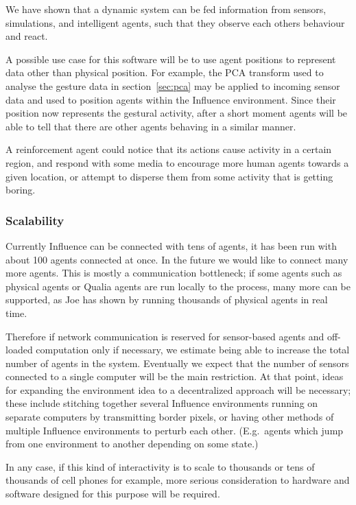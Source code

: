 \documentclass{article}
\begin{document}
We have shown that a dynamic system can be fed information from
sensors, simulations, and intelligent agents, such that they observe
each others behaviour and react.

A possible use case for this software will be to use agent positions
to represent data other than physical position.
For example, the PCA transform used to analyse the gesture data in
section~\ref{sec:pca} may be applied to incoming sensor data and used
to position agents within the Influence environment.
Since their position now represents the gestural activity, after a
short moment agents will be able to tell that there are other agents
behaving in a similar manner.

A reinforcement agent could notice that its actions cause activity in
a certain region, and respond with some media to encourage more human
agents towards a given location, or attempt to disperse them from some
activity that is getting boring.

\subsubsection{Scalability}

Currently Influence can be connected with tens of agents, it has been
run with about 100 agents connected at once.
In the future we would like to connect many more agents.
This is mostly a communication bottleneck; if some agents such as
physical agents or Qualia agents are run locally to the process, many
more can be supported, as Joe has shown by running thousands of
physical agents in real time.

Therefore if network communication is reserved for sensor-based agents
and off-loaded computation only if necessary, we estimate being able
to increase the total number of agents in the system.
Eventually we expect that the number of sensors connected to a single
computer will be the main restriction.
At that point, ideas for expanding the environment idea to a
decentralized approach will be necessary; these include stitching
together several Influence environments running on separate computers
by transmitting border pixels, or having other methods of multiple
Influence environments to perturb each other.
(E.g.\ agents which jump from one environment to another depending on
some state.)

In any case, if this kind of interactivity is to scale to thousands or
tens of thousands of cell phones for example, more serious
consideration to hardware and software designed for this purpose will
be required.
\end{document}
